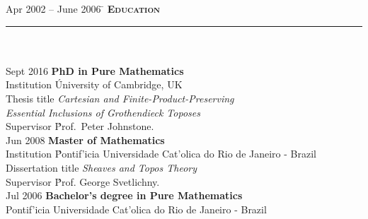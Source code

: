 \documentclass[11pt,a4paper]{article}
\begin{document}
\begin{tabbing} 
Apr 2002 -- June 2006 \=\kill
\> \textbf{\Large{\textsc{Education}}} \\
\> \noindent\rule{11cm}{1pt}\\
\> \\
\> Sept 2016 \' \textbf{PhD in Pure Mathematics}\\
\> Institution \' University of Cambridge, UK\\ 
\> Thesis title \' \textit{Cartesian and Finite-Product-Preserving} \\ \> \textit{Essential Inclusions of Grothendieck Toposes} \\
\>Supervisor \' Prof.\ Peter Johnstone.\\ [.5\baselineskip]

 \> Jun 2008 \' \textbf{Master of Mathematics}\\
\> Institution \' Pontif\a'icia Universidade Cat\a'olica do Rio de Janeiro - Brazil\\
\>Dissertation title  \' \textit{Sheaves and Topos Theory}\\
\>Supervisor \' Prof. George Svetlichny.\\ [.5\baselineskip]

\> Jul 2006 \' \textbf{Bachelor's degree in Pure Mathematics}\\
\>Pontif\a'icia Universidade Cat\a'olica do Rio de Janeiro - Brazil\\
\end{tabbing}
\end{document}
